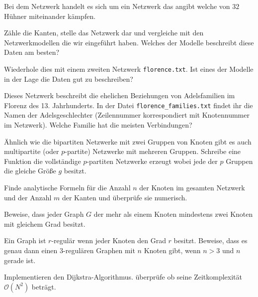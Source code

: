 Bei dem Netzwerk handelt es sich um ein Netzwerk das angibt welche von $32$ H\"uhner miteinander k\"ampfen.

Z\"ahle die Kanten, stelle das Netzwerk dar und vergleiche mit den Netzwerkmodellen die wir eingef\"uhrt haben. Welches der Modelle beschreibt diese Daten am besten?

Wiederhole dies mit einem zweiten Netzwerk {\tt florence.txt}. Ist eines der Modelle in der Lage die Daten gut zu beschreiben?

Dieses Netzwerk beschreibt die ehelichen Beziehungen von Adelsfamilien im Florenz des 13. Jahrhunderts. In der Datei {\tt florence\_families.txt} findet ihr die Namen der Adelsgeschlechter (Zeilennummer korrespondiert mit Knotennummer im Netzwerk). Welche Familie hat die meisten Verbindungen?

\exercise[%
  topic=Zusatzaufgaben
    ]

\subexercise[%
  topic=Multipartite Netzwerke,
    ]
		
\"Ahnlich wie die bipartiten Netzwerke mit zwei Gruppen von Knoten gibt es auch multipartite (oder $p$-partite) Netzwerke mit mehreren Gruppen. Schreibe eine Funktion die vollst\"andige $p$-partiten Netzwerke erzeugt wobei jede der $p$ Gruppen die gleiche Gr\"o\ss e $g$ besitzt.

Finde analytische Formeln f\"ur die Anzahl $n$ der Knoten im gesamten Netzwerk und der Anzahl $m$ der Kanten und \"uberpr\"ufe sie numerisch.
		
		\subexercise[%
  topic=Knoten mit gleichem Grad,
    ]
		Beweise, dass jeder Graph $G$ der mehr als einem Knoten mindestens zwei Knoten mit gleichem Grad besitzt.
 
\subexercise[%
  topic=$3$-regul\"are Graphen,
    ]
		Ein Graph ist $r$-regul\"ar wenn jeder Knoten den Grad $r$ besitzt. Beweise, dass es genau dann einen $3$-regul\"aren Graphen mit $n$ Knoten gibt, wenn $n>3$ und $n$ gerade ist.
		
		
		\subexercise[%
  topic=Dijkstra-Algorithmus,
    ]
		
		Implementieren den Dijkstra-Algorithmus. \"uberpr\"ufe ob seine Zeitkomplexit\"at $\mathcal{O}(N^2)$ betr\"agt.
		


